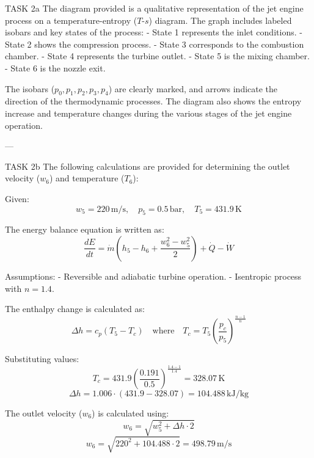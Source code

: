 TASK 2a  
The diagram provided is a qualitative representation of the jet engine process on a temperature-entropy (\( T \)-\( s \)) diagram. The graph includes labeled isobars and key states of the process:  
- State 1 represents the inlet conditions.  
- State 2 shows the compression process.  
- State 3 corresponds to the combustion chamber.  
- State 4 represents the turbine outlet.  
- State 5 is the mixing chamber.  
- State 6 is the nozzle exit.  

The isobars (\( p_0, p_1, p_2, p_3, p_4 \)) are clearly marked, and arrows indicate the direction of the thermodynamic processes. The diagram also shows the entropy increase and temperature changes during the various stages of the jet engine operation.

---

TASK 2b  
The following calculations are provided for determining the outlet velocity (\( w_6 \)) and temperature (\( T_6 \)):  

Given:  
\[
w_5 = 220 \, \text{m/s}, \quad p_5 = 0.5 \, \text{bar}, \quad T_5 = 431.9 \, \text{K}
\]

The energy balance equation is written as:  
\[
\frac{dE}{dt} = \dot{m} \left( h_5 - h_6 + \frac{w_6^2 - w_5^2}{2} \right) + \dot{Q} - \dot{W}
\]

Assumptions:  
- Reversible and adiabatic turbine operation.  
- Isentropic process with \( n = 1.4 \).  

The enthalpy change is calculated as:  
\[
\Delta h = c_p (T_5 - T_c) \quad \text{where} \quad T_c = T_5 \left( \frac{p_c}{p_5} \right)^{\frac{n-1}{n}}
\]

Substituting values:  
\[
T_c = 431.9 \left( \frac{0.191}{0.5} \right)^{\frac{1.4-1}{1.4}} = 328.07 \, \text{K}
\]
\[
\Delta h = 1.006 \cdot (431.9 - 328.07) = 104.488 \, \text{kJ/kg}
\]

The outlet velocity (\( w_6 \)) is calculated using:  
\[
w_6 = \sqrt{w_5^2 + \Delta h \cdot 2}
\]
\[
w_6 = \sqrt{220^2 + 104.488 \cdot 2} = 498.79 \, \text{m/s}
\]